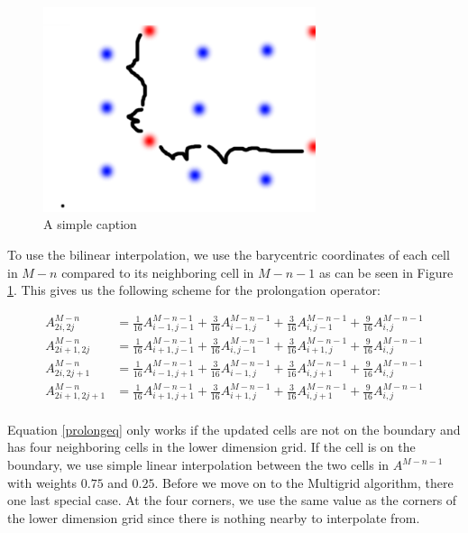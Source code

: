 \begin{figure}[ht!]
\centering
\includegraphics[width=80mm]{img/prolong.png}
\caption{A simple caption}
\label{prolong}
\end{figure}

To use the bilinear interpolation, we use the barycentric coordinates of each cell in $M-n$ compared to its neighboring cell in $M-n-1$ as can be seen in Figure \ref{prolong}. This gives us the following scheme for the prolongation operator:

\begin{equation}
\begin{split}
A^{M-n}_{2i,2j} &= \frac{1}{16} A^{M-n-1}_{i-1,j-1} +  \frac{3}{16} A^{M-n-1}_{i-1,j} +  \frac{3}{16} A^{M-n-1}_{i,j-1}+  \frac{9}{16} A^{M-n-1}_{i,j} \\ 
A^{M-n}_{2i + 1,2j} &= \frac{1}{16} A^{M-n-1}_{i+1,j-1} +  \frac{3}{16} A^{M-n-1}_{i,j-1} +  \frac{3}{16} A^{M-n-1}_{i+1,j}+  \frac{9}{16} A^{M-n-1}_{i,j} \\ 
A^{M-n}_{2i,2j+1} &= \frac{1}{16} A^{M-n-1}_{i-1,j+1} +  \frac{3}{16} A^{M-n-1}_{i-1,j} +  \frac{3}{16} A^{M-n-1}_{i,j+1}+  \frac{9}{16} A^{M-n-1}_{i,j} \\ 
A^{M-n}_{2i+1,2j+1} &= \frac{1}{16} A^{M-n-1}_{i+1,j+1} +  \frac{3}{16} A^{M-n-1}_{i+1,j} +  \frac{3}{16} A^{M-n-1}_{i,j+1}+  \frac{9}{16} A^{M-n-1}_{i,j} \\ 
\end{split}
\label{prolongeq}
\end{equation}

Equation \ref{prolongeq} only works if the updated cells are not on the boundary and has four neighboring cells in the lower dimension grid. If the cell is on the boundary, we use simple linear interpolation between the two cells in $A^{M-n-1}$ with weights $0.75$ and $0.25$. Before we move on to the Multigrid algorithm, there one last special case. At the four corners, we use the same value as the corners of the lower dimension grid since there is nothing nearby to interpolate from.
